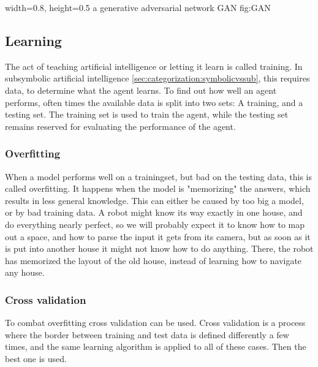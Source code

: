     {width=0.8\textwidth, height=0.5\textheight} %
    {a generative adversarial network}   %
    {GAN}   %
    {fig:GAN}    %

\subsection{Learning} \cite[p. 693]{MA}
The act of teaching artificial intelligence or letting it learn is called training. In subsymbolic artificial intelligence \autoref{sec:categorization:symbolicvssub}, this requires data, to determine what the agent learns. To find out how well an agent performs, often times the available data is split into two sets: A training, and a testing set. The training set is used to train the agent, while the testing set remains reserved for evaluating the performance of the agent.

\subsubsection{Overfitting}
\label{sec:overfitting}
When a model performs well on a trainingset, but bad on the testing data, this is called overfitting. It happens when the model is "memorizing" the answers, which results in less general knowledge. This can either be caused by too big a model, or by bad training data\cite{overfit}. A robot might know its way exactly in one house, and do everything nearly perfect, so we will probably expect it to know how to map out a space, and how to parse the input it gets from its camera, but as soon as it is put into another house it might not know how to do anything. There, the robot has memorized the layout of the old house, instead of learning how to navigate any house.

\subsubsection{Cross validation}
\cite[p. 709]{MA}
To combat overfitting cross validation can be used. Cross validation is a process where the border between training and test data is defined differently a few times, and the same learning algorithm is applied to all of these cases. Then the best one is used.